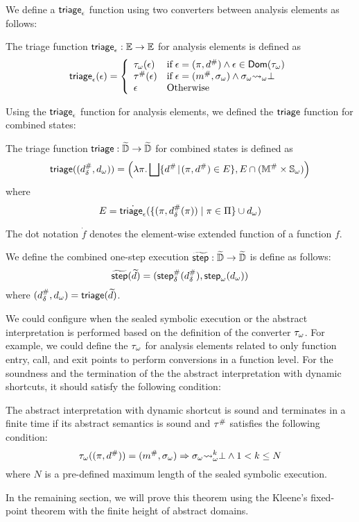 We define a $\atriage$ function using two converters between analysis elements
as follows:
\begin{definition}[$\atriage$]\label{def:atriage}
  The triage function $\textsf{triage}_\epsilon: \mathbb{E} \rightarrow \mathbb{E}$ for analysis
  elements is defined as
  \[
    \textsf{triage}_\epsilon(\epsilon) = \left\{
      \begin{array}{ll}
        {\tau}_\omega(\epsilon)
        & \text{if} \; \epsilon = (\pi, {d}^{\#}) \wedge \epsilon \in
        \textsf{Dom}({\tau}_\omega)\\
        {\tau}^{\#}(\epsilon)
        & \text{if} \; \epsilon = ({m}^{\#}, {\sigma}_\omega) \wedge {\sigma}_\omega {\leadsto}_\omega
        \bot\\
        \epsilon
        & \text{Otherwise}
      \end{array}
    \right.
  \]
\end{definition}
Using the $\atriage$ function for analysis elements, we defined the $\triage$
function for combined states:
\begin{definition}[$\triage$]\label{def:triage}
  The triage function $\textsf{triage}: \widetilde{\mathbb{D}} \rightarrow \widetilde{\mathbb{D}}$ for combined
  states is defined as
  \[
    \textsf{triage}(({{d}^{\#}_\delta}, {d}_\omega)) = \left(
      \lambda \pi. \bigsqcup \{ {d}^{\#} \!\mid\! (\pi, {d}^{\#}) \in E \},
      E \cap ({\mathbb{M}}^{\#} \times {\mathbb{S}}_\omega)
    \right)
  \]
  where
  \[
    E = \dot{\textsf{triage}_\epsilon}(\{ (\pi, {{d}^{\#}_\delta}(\pi)) \mid \pi \in \Pi \} \cup {d}_\omega)
  \]
\end{definition}
The dot notation $\dot{f}$ denotes the element-wise extended function of a
function $f$.

\begin{definition}
  We define the combined one-step execution $\widetilde{\textsf{step}}: \widetilde{\mathbb{D}} \rightarrow
  \widetilde{\mathbb{D}}$ is define as follows:
  \[
    \widetilde{\textsf{step}}(\widetilde{d}) = (
      {\textsf{step}}^{\#}_\delta({{d}^{\#}_\delta}),
      {\textsf{step}}_\omega({d}_\omega)
    )
  \]
  where $({{d}^{\#}_\delta}, {d}_\omega) = \textsf{triage}(\widetilde{d})$.
\end{definition}

We could configure when the sealed symbolic execution or the abstract
interpretation is performed based on the definition of the converter
${\tau}_\omega$.  For example, we could define the ${\tau}_\omega$ for analysis
elements related to only function entry, call, and exit points to perform
conversions in a function level.  For the soundness and the termination of the
the abstract interpretation with dynamic shortcuts, it should satisfy the
following condition:
\begin{theorem}\label{theorem:shortcut}
  The abstract interpretation with dynamic shortcut is sound and terminates in a
  finite time if its abstract semantics is sound and ${\tau}^{\#}$ satisfies the
  following condition:
  \begin{equation}\label{equ:cond}
    {\tau}_\omega((\pi, {d}^{\#})) = ({m}^{\#}, {\sigma}_\omega) \Rightarrow
    {\sigma}_\omega {\leadsto}_\omega^k \bot \wedge 1 < k \leq N
  \end{equation}
  where $N$ is a pre-defined maximum length of the sealed symbolic execution.
\end{theorem}

In the remaining section, we will prove this theorem using the Kleene's
fixed-point theorem with the finite height of abstract domains.
